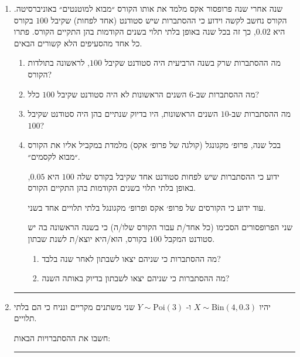 \documentclass[12pt, a4paper]{article}
\newcommand{\Bin}{\mathrm{Bin}}
\newcommand{\PP}{\mathbb{P}}
\begin{document}
\begin{enumerate}

\item
שנה אחרי שנה פרופסור אקס מלמד את אותו הקורס ״מבוא למוטנטים״ באוניברסיטה.  
הקורס נחשב לקשה וידוע כי ההסתברות שיש סטודנט (אחד לפחות) שקיבל
$100$
בקורס היא
$0.02$,
כך זה בכל שנה באופן בלתי תלוי בשנים הקודמות בהן התקיים הקורס.
פתרו כל אחד מהסעיפים הלא קשורים הבאים.
\begin{enumerate}
\item
מה ההסתברות שרק בשנה הרביעית היה סטודנט שקיבל
$100$,
לראשונה בתולדות הקורס?
\item
מה ההסתברות שב-$6$
השנים הראשונות לא היה סטודנט שקיבל
$100$
כלל?
\item
מה ההסתברות שב-$10$ השנים הראשונות, היו בדיוק שנתיים בהן היה סטודנט שקיבל 
$100$?
\item
 בכל שנה,
 פרופ׳ מקגונגל (קולגה של פרופ׳ אקס) מלמדת במקביל אליו את הקורס ״מבוא לקסמים״.
 
ידוע כי  ההסתברות שיש לפחות סטודנט אחד שקיבל בקורס שלה
$100$
היא
$0.05$,
באופן בלתי תלוי בשנים הקודמות בהן התקיים הקורס.

עוד ידוע כי הקורסים של פרופ׳ אקס ופרופ׳ מקגונגל  בלתי תלויים אחד בשני.

שני הפרופסורים הסכימו (כל אחד/ת עבור הקורס שלו/ה) כי בשנה הראשונה  בה יש סטודנט המקבל
$100$
בקורס, הוא/היא יוצא/ת לשנת שבתון. 
\begin{enumerate}
\item[(i)]
מה ההסתברות כי שניהם יצאו לשבתון לאחר שנה בלבד?
\item[(ii)]
מה ההסתברות כי שניהם יצאו לשבתון בדיוק באותה השנה? 
\end{enumerate}
\end{enumerate}

\noindent\rule{15cm}{0.4pt}

\item
יהיו
$X\sim \Bin(4,0.3)$
ו-
$Y\sim \mathrm{Poi}(3)$
שני משתנים מקריים
ונניח כי הם
 בלתי תלויים.

חשבו את ההסתברויות הבאות:
\begin{enumerate}
\end{enumerate}

\noindent\rule{15cm}{0.4pt}


\end{enumerate}
\end{document}
